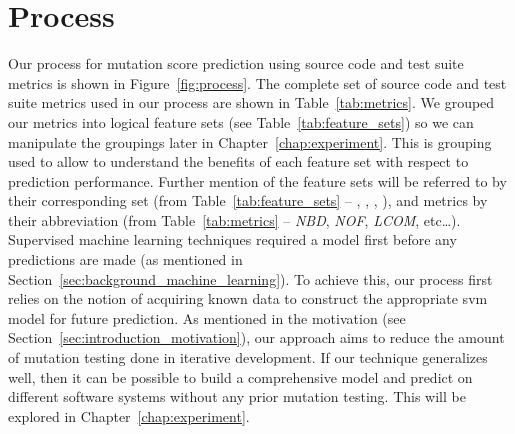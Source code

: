 \section{Process}
\label{sec:approach_process}
Our process for mutation score prediction using source code and test suite metrics is shown in Figure~\ref{fig:process}. The complete set of source code and test suite metrics used in our process are shown in Table~\ref{tab:metrics}. We grouped our metrics into logical feature sets (see Table~\ref{tab:feature_sets}) so we can manipulate the groupings later in Chapter~\ref{chap:experiment}. This is grouping used to allow to understand the benefits of each feature set with respect to prediction performance. Further mention of the feature sets will be referred to by their corresponding set (from Table~\ref{tab:feature_sets} -- , , , ), and metrics by their abbreviation (from Table~\ref{tab:metrics} -- \emph{NBD}, \emph{NOF}, \emph{LCOM}, etc\ldots). Supervised machine learning techniques required a model first before any predictions are made (as mentioned in Section~\ref{sec:background_machine_learning}). To achieve this, our process first relies on the notion of acquiring known data to construct the appropriate \gls{svm} model for future prediction. As mentioned in the motivation (see Section~\ref{sec:introduction_motivation}), our approach aims to reduce the amount of mutation testing done in iterative development. If our technique generalizes well, then it can be possible to build a comprehensive model and predict on different software systems without any prior mutation testing. This will be explored in Chapter~\ref{chap:experiment}.

